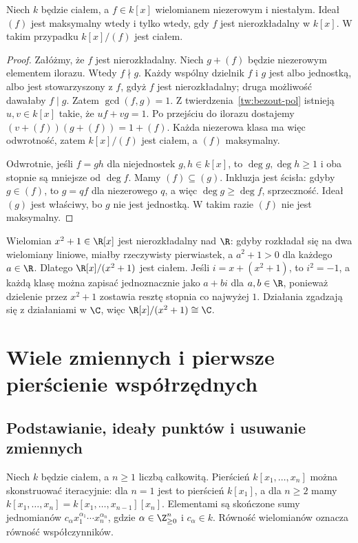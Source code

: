 \begin{twierdzenie}
\label{tw:irreducible}
Niech $k$ będzie ciałem, a $f\in k[x]$ wielomianem niezerowym
i niestałym. Ideał $(f)$ jest maksymalny wtedy i tylko wtedy,
gdy $f$ jest nierozkładalny w $k[x]$. W takim przypadku
$k[x]/(f)$ jest ciałem.
\end{twierdzenie}
\begin{proof}
Załóżmy, że $f$ jest nierozkładalny.
Niech $g+(f)$ będzie niezerowym elementem ilorazu.
Wtedy $f\nmid g$. Każdy wspólny dzielnik $f$ i $g$
jest albo jednostką, albo jest stowarzyszony z $f$,
gdyż $f$ jest nierozkładalny; druga możliwość dawałaby $f\mid g$.
Zatem $\gcd(f,g)=1$. Z twierdzenia~\ref{tw:bezout-pol}
istnieją $u,v\in k[x]$ takie, że $uf+vg=1$.
Po przejściu do ilorazu dostajemy
$(v+(f))(g+(f))=1+(f)$. Każda niezerowa klasa ma więc odwrotność,
zatem $k[x]/(f)$ jest ciałem, a $(f)$ maksymalny.

Odwrotnie, jeśli $f=gh$ dla niejednostek $g,h\in k[x]$,
to $\deg g,\deg h\ge1$ i oba stopnie są mniejsze od $\deg f$.
Mamy $(f)\subseteq(g)$. Inkluzja jest ścisła:
gdyby $g\in(f)$, to $g=qf$ dla niezerowego $q$,
a więc $\deg g\ge\deg f$, sprzeczność.
Ideał $(g)$ jest właściwy, bo $g$ nie jest jednostką.
W takim razie $(f)$ nie jest maksymalny.
\end{proof}

\begin{przyklad}
Wielomian $x^2+1\in\R[x]$ jest nierozkładalny nad $\R$:
gdyby rozkładał się na dwa wielomiany liniowe,
miałby rzeczywisty pierwiastek, a $a^2+1>0$ dla każdego $a\in\R$.
Dlatego $\R[x]/(x^2+1)$ jest ciałem.
Jeśli $i=x+(x^2+1)$, to $i^2=-1$, a każdą klasę można zapisać
jednoznacznie jako $a+bi$ dla $a,b\in\R$,
ponieważ dzielenie przez $x^2+1$ zostawia resztę stopnia co najwyżej $1$.
Działania zgadzają się z działaniami w $\C$,
więc $\R[x]/(x^2+1)\cong\C$.
\end{przyklad}

\section{Wiele zmiennych i pierwsze pierścienie współrzędnych}

\subsection{Podstawianie, ideały punktów i usuwanie zmiennych}

Niech $k$ będzie ciałem, a $n\ge1$ liczbą całkowitą.
Pierścień $k[x_1,\dots,x_n]$
można skonstruować iteracyjnie: dla $n=1$ jest to
pierścień $k[x_1]$, a dla $n\ge2$ mamy
$k[x_1,\dots,x_n]=k[x_1,\dots,x_{n-1}][x_n]$.
Elementami są skończone sumy jednomianów
$c_{\alpha}x_1^{\alpha_1}\cdots x_n^{\alpha_n}$,
gdzie $\alpha\in\Z_{\ge0}^n$ i $c_\alpha\in k$.
Równość wielomianów oznacza równość współczynników.

